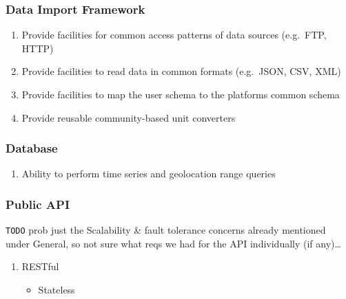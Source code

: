 \subsubsection{Data Import Framework}\label{data-import-framework}

\begin{enumerate}
\def\labelenumi{\arabic{enumi}.}
\tightlist
\item
  Provide facilities for common access patterns of data sources
  (e.g.~FTP, HTTP)
\item
  Provide facilities to read data in common formats (e.g.~JSON, CSV,
  XML)
\item
  Provide facilities to map the user schema to the platforms common
  schema
\item
  Provide reusable community-based unit converters
\end{enumerate}

\subsubsection{Database}\label{database}

\begin{enumerate}
\def\labelenumi{\arabic{enumi}.}
\tightlist
\item
  Ability to perform time series and geolocation range queries
\end{enumerate}

\subsubsection{Public API}\label{public-api}

\texttt{TODO} prob just the Scalability \& fault tolerance concerns
already mentioned under General, so not sure what reqs we had for the
API individually (if any)\ldots{}

\begin{enumerate}
\def\labelenumi{\arabic{enumi}.}
\tightlist
\item
  RESTful

  \begin{itemize}
  \tightlist
  \item
    Stateless
  \end{itemize}
\end{enumerate}

